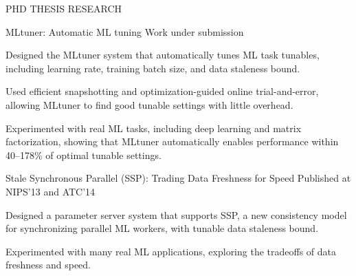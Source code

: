 \documentclass{resume} %
\begin{document}
\begin{rSection}{PHD THESIS RESEARCH}
\begin{rSubsection}{\hspace{-1em} MLtuner: Automatic ML tuning}{}
{Work under submission}{}
\vspace{-0.3em}
\item Designed the MLtuner system that automatically tunes ML task tunables, including learning rate, training batch size, and data staleness bound.
\item Used efficient snapshotting and optimization-guided online trial-and-error, allowing MLtuner to find good tunable settings with little overhead.
\item Experimented with real ML tasks, including deep learning and matrix factorization, showing that MLtuner automatically enables performance within 40--178\% of optimal tunable settings.
\end{rSubsection}
\vspace{-.1in}


\begin{rSubsection}{\hspace{-1em} Stale Synchronous Parallel (SSP): Trading Data Freshness for Speed}{}
{Published at NIPS'13 and ATC'14}{}
\vspace{-0.3em}
\item Designed a parameter server system that supports SSP, a new consistency model for synchronizing parallel ML workers, with tunable data staleness bound.
\item Experimented with many real ML applications, exploring the tradeoffs of data freshness and speed.
\end{rSubsection}
\vspace{-.1in}

\end{rSection}
\vspace{-.05in}
\end{document}
